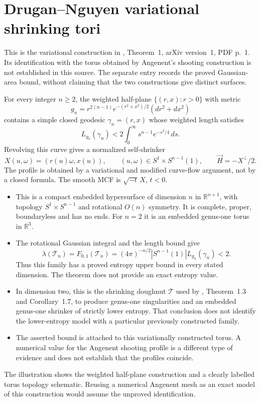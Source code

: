 \chapter{Drugan--Nguyen variational shrinking tori}\label{sec:catalogue-drugan-nguyen-torus}
This is the variational construction in \cite{CatDruganNguyen2018},
Theorem~1, arXiv version~1, PDF p.~1. Its identification with the torus
obtained by Angenent's shooting construction is not established in this
source. The separate entry records the proved Gaussian-area bound,
without claiming that the two constructions give distinct surfaces.

\begin{example}\label{ex:catalogue-drugan-nguyen-torus}
For every integer $n\geq2$, the weighted half-plane $\{(r,x):r>0\}$
with metric
\[
 g_n=r^{2(n-1)}e^{-(r^2+x^2)/2}(dr^2+dx^2)
\]
contains a simple closed geodesic $\gamma_n=(r,x)$ whose weighted
length satisfies
\[
 L_{g_n}(\gamma_n)<2\int_0^\infty s^{n-1}e^{-s^2/4}\,ds.
\]
Revolving this curve gives a normalized self-shrinker
\[
 X(u,\omega)=(r(u)\omega,x(u)),\qquad
 (u,\omega)\in S^1\times S^{n-1}(1),
 \qquad \vec H=-X^\perp/2.
\]
The profile is obtained by a variational and modified curve-flow
argument, not by a closed formula. The smooth MCF is
$\sqrt{-t}\,X$, $t<0$.
\begin{itemize}
\item This is a compact embedded hypersurface of dimension $n$ in
$\mathbb R^{n+1}$, with topology $S^1\times S^{n-1}$ and rotational
$O(n)$ symmetry. It is complete, proper, boundaryless and has no ends.
For $n=2$ it is an embedded genus-one torus in $\mathbb R^3$.
\item The rotational Gaussian integral and the length bound give
\[
 \lambda(\mathcal T_n)=F_{0,1}(\mathcal T_n)
 =(4\pi)^{-n/2}|S^{n-1}(1)|L_{g_n}(\gamma_n)<2.
\]
Thus this family has a proved entropy upper bound in every stated
dimension. The theorem does not provide an exact entropy value.
\item In dimension two, this is the shrinking doughnut $\mathcal T$
used by \cite{CatChuSun2025}, Theorem~1.3 and Corollary~1.7,
to produce genus-one singularities and an embedded genus-one shrinker
of strictly lower entropy. That conclusion does not identify the
lower-entropy model with a particular previously constructed family.
\item The asserted bound is attached to this variationally constructed
torus. A numerical value for the Angenent shooting profile is a
different type of evidence and does not establish that the profiles
coincide.
\end{itemize}
The illustration shows the weighted half-plane construction and a
clearly labelled torus topology schematic. Reusing a numerical
Angenent mesh as an exact model of this construction would assume the
unproved identification.
\end{example}


